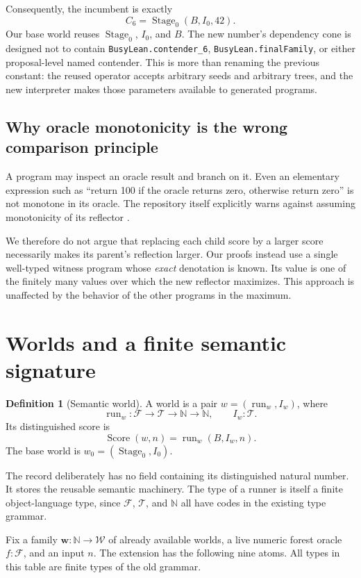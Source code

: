 \documentclass[11pt]{article}
\theoremstyle{definition}
\newtheorem{definition}[theorem]{Definition}
\theoremstyle{remark}
\newcommand{\N}{\mathbb N}
\newcommand{\Tree}{\mathcal T}
\newcommand{\Fam}{\mathcal F}
\newcommand{\World}{\mathcal W}
\newcommand{\Score}{\operatorname{Score}}
\newcommand{\OldStage}{\operatorname{Stage}_0}
\newcommand{\code}[1]{\texttt{#1}}
\newcommand{\ctx}{\boldsymbol w}
\begin{document}
Consequently, the incumbent is exactly
\[
                       C_6=\OldStage(B,I_0,42).
\]
Our base world reuses $\OldStage$, $I_0$, and $B$. The new number's dependency
cone is designed not to contain \code{BusyLean.contender\_6},
\code{BusyLean.finalFamily}, or either proposal-level named contender. This
is more than renaming the previous constant: the reused operator accepts
arbitrary seeds and arbitrary trees, and the new interpreter makes those
parameters available to generated programs.

\subsection{Why oracle monotonicity is the wrong comparison principle}

A program may inspect an oracle result and branch on it. Even an elementary
expression such as ``return 100 if the oracle returns zero, otherwise return
zero'' is not monotone in its oracle. The repository itself explicitly warns
against assuming monotonicity of its reflector \cite{reflectionfacts}.

We therefore do not argue that replacing each child score by a larger score
necessarily makes its parent's reflection larger. Our proofs instead use a
single well-typed witness program whose \emph{exact} denotation is known.
Its value is one of the finitely many values over which the new reflector
maximizes. This approach is unaffected by the behavior of the other
programs in the maximum.

\section{Worlds and a finite semantic signature}\label{sec:worlds}

\begin{definition}[Semantic world]
A world is a pair $w=(\operatorname{run}_w,I_w)$, where
\[
 \operatorname{run}_w:\Fam\to\Tree\to\N\to\N,
 \qquad I_w:\Tree.
\]
Its distinguished score is
\[
                  \Score(w,n)=\operatorname{run}_w(B,I_w,n).
\]
The base world is $w_0=(\OldStage,I_0)$.
\end{definition}

The record deliberately has no field containing its distinguished natural
number. It stores the reusable semantic machinery. The type of a runner is
itself a finite object-language type, since $\Fam$, $\Tree$, and $\N$ all
have codes in the existing type grammar.

Fix a family $\ctx:\N\to\World$ of already available worlds, a live numeric
forest oracle $f:\Fam$, and an input $n$. The extension has the following
nine atoms. All types in this table are finite types of the old grammar.
\end{document}
